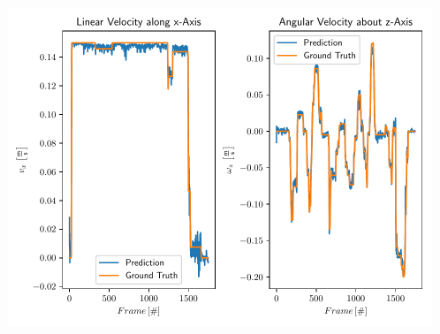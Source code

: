 \begin{figure}
	\centering
	\includegraphics[scale=.5]{chapters/05_experiments/04_autonomous_walking/user_and_predicted_velocity_at_epoch_40.pdf}
	\caption{}
	\label{fig::542_vel}
\end{figure}
